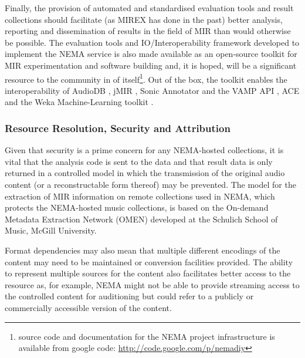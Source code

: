 \documentclass[conference]{IEEEtran}
\begin{document}
Finally, the provision of automated and standardised evaluation tools and result collections should facilitate (as MIREX has done in the past) better analysis, reporting and dissemination of results in the field of MIR than would otherwise be possible.
The evaluation tools and IO/Interoperability framework developed to implement the NEMA service is also made available as an open-source toolkit for MIR experimentation and software building and, it is hoped, will be a significant resource to the community in of itself\footnote{source code and documentation for the NEMA project infrastructure is available from google code: \url{http://code.google.com/p/nemadiy}}. 
Out of the box, the toolkit enables the interoperability of AudioDB \cite{casey2008audiodb}, jMIR \cite{mckay2009jmir}, Sonic Annotator and the VAMP API \cite{cannam2006sonic}, ACE \cite{mckay2005ace} and the Weka Machine-Learning toolkit \cite{witten1999wpm}.  


\subsubsection{Resource Resolution, Security and Attribution}
Given that security is a prime concern for any NEMA-hosted collections, it is vital that the analysis code is sent to the data and that result data is only returned in a controlled model in which the transmission of the original audio content (or a reconstructable form thereof) may be prevented.
The model for the extraction of MIR information on remote collections used in NEMA, which protects the NEMA-hosted music collections, is based on the On-demand Metadata Extraction Network (OMEN) \cite{mcennis2006overview} developed at the Schulich School of Music, McGill University.

Format dependencies may also mean that multiple different encodings of the content may need to be maintained or conversion facilities provided. The ability to represent multiple sources for the content also facilitates better access to the resource as, for example, NEMA might not be able to provide streaming access to the controlled content for auditioning but could refer to a publicly or commercially accessible version of the content. 
\end{document}
